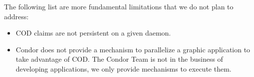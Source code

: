 The following list are more fundamental limitations that we do not
plan to address:

\begin{itemize}

\item COD claims are not persistent on a given  daemon.

\item Condor does not provide a mechanism to parallelize a graphic
  application to take advantage of COD.  
  The Condor Team is not in the business of developing applications,
  we only provide mechanisms to execute them.

\end{itemize}
